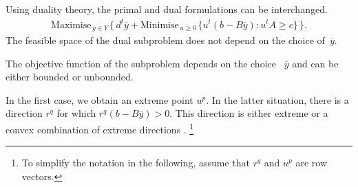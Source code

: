 \newpage
\subsection*{}


Using duality theory, the primal and dual formulations can be interchanged.
\begin{eqnarray*}
\label{bd4}  \textrm{Maximise}_{\, \overline{y} \in Y \,} \{\,
d^t\overline{y} + \textrm{Minimise}_{\, u\geq 0 \,} \{ u^t(b-B\overline{y})
: u^tA \geq c\}\, \}.
\end{eqnarray*}
The feasible space of the dual subproblem does not depend on the choice of~$\overline{y}$.

\vfill

 The objective function of the subproblem depends on the choice ~$\overline{y}$ and can be either bounded or unbounded. 


\begin{center}
\end{center}

\vfill


In the first case, we obtain an extreme point $u^p$. In the latter situation, there is a direction $r^q$ for which $r^q(b-B\overline{y}) > 0$.  This direction is either extreme or a convex combination of extreme directions \cite{costa09benders}. \footnote{To simplify the notation in the following, assume that $r^q$ and $u^p$ are row vectors.}
\vfill


